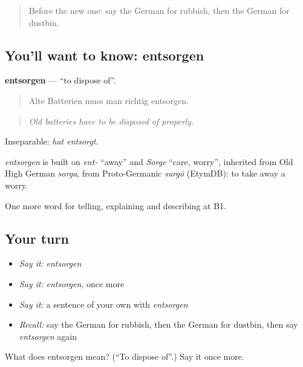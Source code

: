 \label{lesson:GE-C528-entsorgen}



\begin{quote}
Before the new one: say the German for rubbish, then the German for dustbin.
\end{quote}

\subsection*{You'll want to know: entsorgen}
\textbf{entsorgen} — \textquotedblleft{}to dispose of\textquotedblright{}.

\begin{quote}
Alte Batterien muss man richtig entsorgen.
\end{quote}

\begin{quote}
\emph{Old batteries have to be disposed of properly.}
\end{quote}

Inseparable: \emph{hat entsorgt}.

\begin{cousinweb}
\emph{entsorgen} is built on \emph{ent-} \textquotedblleft{}away\textquotedblright{} and \emph{Sorge} \textquotedblleft{}care, worry\textquotedblright{}, inherited from Old High German \emph{sorga}, from Proto-Germanic \emph{surgō} (EtymDB): to take away a worry.
\end{cousinweb}

\begin{grammarlens}[title={What you've built}]
One more word for telling, explaining and describing at B1.
\end{grammarlens}

\subsection*{Your turn}
\begin{itemize}
\raggedright
  \item \emph{Say it:} \emph{entsorgen}
  \item \emph{Say it:} \emph{entsorgen}, once more
  \item \emph{Say it:} a sentence of your own with \emph{entsorgen}
  \item \emph{Recall:} say the German for rubbish, then the German for dustbin, then say \emph{entsorgen} again
\end{itemize}

\begin{tcolorbox}[breakable,colback=teal!4,colframe=teal!35!black,title={Before you move on}]
What does entsorgen mean? (\textquotedblleft{}To dispose of\textquotedblright{}.) Say it once more.
\end{tcolorbox}
